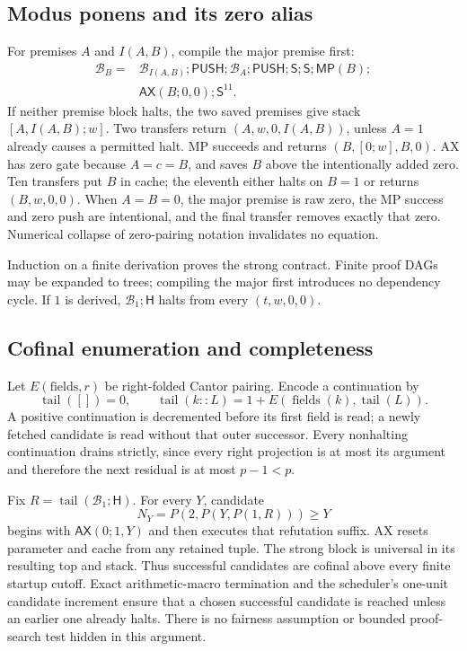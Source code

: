 \documentclass[11pt]{article}
\newcommand{\AX}{\mathsf{AX}}
\newcommand{\MP}{\mathsf{MP}}
\newcommand{\SSS}{\mathsf S}
\newcommand{\PushBlock}{\mathsf{PUSH}}
\newcommand{\PopBlock}{\mathsf H}
\begin{document}
\subsection{Modus ponens and its zero alias}

For premises $A$ and $I(A,B)$, compile the major premise first:
\[
\begin{split}
 \mathcal B_B={}&\mathcal B_{I(A,B)};\PushBlock;
 \mathcal B_A;\PushBlock;\SSS;\SSS;\MP(B);\\
 &\AX(B;0,0);\SSS^{11}.
\end{split}                                                     \tag{8}
\]
If neither premise block halts, the two saved premises give stack
$[A,I(A,B);w]$. Two transfers return $(A,w,0,I(A,B))$, unless $A=1$ already causes a permitted halt. MP succeeds and returns $(B,[0;w],B,0)$. AX has zero gate because $A=c=B$, and saves $B$ above the intentionally added zero. Ten transfers put $B$ in cache; the eleventh either halts on $B=1$ or returns $(B,w,0,0)$. When $A=B=0$, the major premise is raw zero, the MP success and zero push are intentional, and the final transfer removes exactly that zero. Numerical collapse of zero-pairing notation invalidates no equation.

Induction on a finite derivation proves the strong contract. Finite proof DAGs may be expanded to trees; compiling the major first introduces no dependency cycle. If $1$ is derived, $\mathcal B_1;\PopBlock$ halts from every $(t,w,0,0)$.

\subsection{Cofinal enumeration and completeness}

Let $E(\text{fields},r)$ be right-folded Cantor pairing. Encode a continuation by
\[
 \operatorname{tail}([])=0,\qquad
 \operatorname{tail}(k::L)=1+E(\operatorname{fields}(k),\operatorname{tail}(L)).
\]
A positive continuation is decremented before its first field is read; a newly fetched candidate is read without that outer successor. Every nonhalting continuation drains strictly, since every right projection is at most its argument and therefore the next residual is at most $p-1<p$.

Fix $R=\operatorname{tail}(\mathcal B_1;\PopBlock)$. For every $Y$, candidate
\[
 N_Y=P(2,P(Y,P(1,R)))\ge Y                                    \tag{9}
\]
begins with $\AX(0;1,Y)$ and then executes that refutation suffix. AX resets parameter and cache from any retained tuple. The strong block is universal in its resulting top and stack. Thus successful candidates are cofinal above every finite startup cutoff. Exact arithmetic-macro termination and the scheduler's one-unit candidate increment ensure that a chosen successful candidate is reached unless an earlier one already halts. There is no fairness assumption or bounded proof-search test hidden in this argument.
\end{document}
